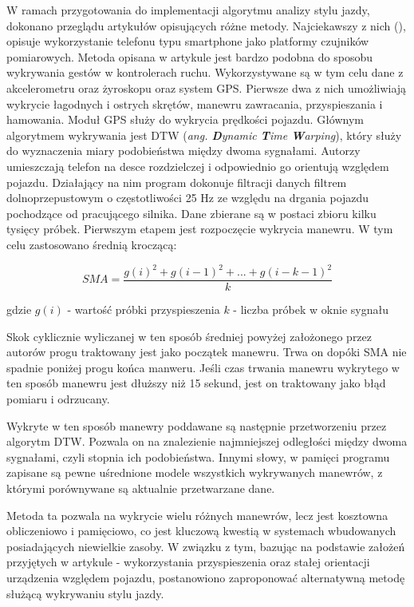 W ramach przygotowania do implementacji algorytmu analizy stylu jazdy, dokonano przeglądu artykułów opisujących różne metody. Najciekawszy z nich (\cite{driving_analysis_article}), opisuje wykorzystanie telefonu typu smartphone jako platformy czujników pomiarowych. Metoda opisana w artykule jest bardzo podobna do sposobu wykrywania gestów w kontrolerach ruchu.  Wykorzystywane są w tym celu dane z akcelerometru oraz żyroskopu oraz system GPS. Pierwsze dwa z nich umożliwiają wykrycie łagodnych i ostrych skrętów, manewru zawracania, przyspieszania i hamowania. Moduł GPS służy do wykrycia prędkości pojazdu. Głównym algorytmem wykrywania jest DTW (\textit{ang. \textbf{D}ynamic \textbf{T}ime \textbf{W}arping}), który służy do wyznaczenia miary podobieństwa między dwoma sygnałami. 
Autorzy umieszczają telefon na desce rozdzielczej i odpowiednio go orientują względem pojazdu. Działający na nim program dokonuje filtracji danych filtrem dolnoprzepustowym o częstotliwości 25 Hz ze względu na drgania pojazdu pochodzące od pracującego silnika. Dane zbierane są w postaci zbioru kilku tysięcy próbek. 
Pierwszym etapem jest rozpoczęcie wykrycia manewru. W tym celu zastosowano średnią kroczącą:

\begin{equation}
	SMA = \frac{g(i)^2 + g(i-1)^2 + ... + g(i-k-1)^2}{k}
\end{equation}

gdzie
$g(i)$ - wartość próbki przyspieszenia
$k$ - liczba próbek w oknie sygnału

Skok cyklicznie wyliczanej w ten sposób średniej powyżej założonego przez autorów progu traktowany jest jako początek manewru. Trwa on dopóki SMA nie spadnie poniżej progu końca manweru. Jeśli czas trwania manewru wykrytego w ten sposób manewru jest dłuższy niż 15 sekund, jest on traktowany jako błąd pomiaru i odrzucany.

Wykryte w ten sposób manewry poddawane są następnie przetworzeniu przez algorytm DTW. Pozwala on na znalezienie najmniejszej odległości między dwoma sygnałami, czyli stopnia ich podobieństwa. Innymi słowy, w pamięci programu zapisane są pewne uśrednione modele wszystkich wykrywanych manewrów, z którymi porównywane są aktualnie przetwarzane dane. 

Metoda ta pozwala na wykrycie wielu różnych manewrów, lecz jest kosztowna obliczeniowo i pamięciowo, co jest kluczową kwestią w systemach wbudowanych posiadających niewielkie zasoby. W związku z tym, bazując na podstawie założeń przyjętych w artykule \cite{driving_analysis_article} - wykorzystania przyspieszenia oraz stałej orientacji urządzenia względem pojazdu, postanowiono zaproponować alternatywną metodę służącą wykrywaniu stylu jazdy.

